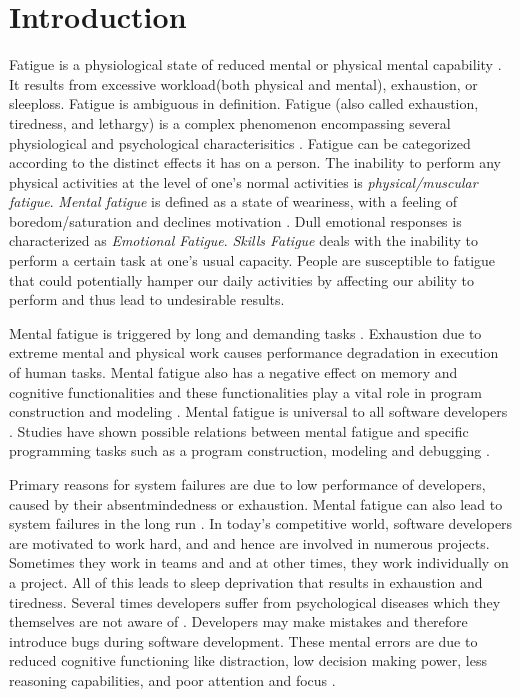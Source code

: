 \documentclass{acm_proc_article-sp}
\begin{document}

\section{Introduction}
Fatigue is a physiological state of reduced mental or physical mental
capability \cite{psychology:paul}. It
results from excessive workload(both physical and mental), exhaustion, or
sleeploss. Fatigue is ambiguous in definition. Fatigue (also called
exhaustion, tiredness, and lethargy) \cite{website:wiki-fatigue} is a complex
phenomenon encompassing several physiological and psychological characterisitics
\cite{psychology:paul}. Fatigue can be categorized according to the distinct
effects it has on a person. The inability to perform any physical activities at
the level of one's normal activities is \textit{physical/muscular fatigue}.
\textit{Mental fatigue} is defined as a state of weariness, with a feeling of
boredom/saturation and declines motivation \cite{lauren:defining}. Dull
emotional responses is characterized as \textit{Emotional Fatigue}.
\textit{Skills Fatigue} deals with the inability to perform a certain task at
one's usual capacity. People are susceptible to fatigue that could
potentially hamper our daily activities by affecting our ability to perform and
thus lead to undesirable results.

Mental fatigue is triggered by long and demanding tasks \cite{lauren:defining}.
Exhaustion due to extreme mental and physical work causes performance
degradation in execution of human tasks. Mental fatigue also has a negative
effect on memory and cognitive functionalities and these functionalities play a
vital role in program construction and modeling \cite{schneiderman:interaction}.
Mental fatigue is universal to all software developers
\cite{website:blog-fatigue}. Studies have shown possible relations between
mental fatigue and specific programming tasks such as a program construction,
modeling and debugging \cite{schneiderman:interaction}.

Primary reasons for system failures are due to low performance of developers,
caused by their absentmindedness or exhaustion. Mental fatigue can also lead to
system failures in the long run \cite{rocco:gartner}. In today's competitive
world, software developers are motivated to work hard, and and hence are
involved in numerous projects. Sometimes they work in teams and and at other
times, they work individually on a project. All of this leads to sleep
deprivation that results in exhaustion and tiredness. Several times developers
suffer from psychological diseases which they themselves are not aware of
\cite{website:blog-fatigue}. Developers may make mistakes and therefore
introduce bugs during software development. These mental errors are due to
reduced cognitive functioning like distraction, low decision making power, less
reasoning capabilities, and poor attention and focus \cite{larson:cogFailures}.
\end{document}
